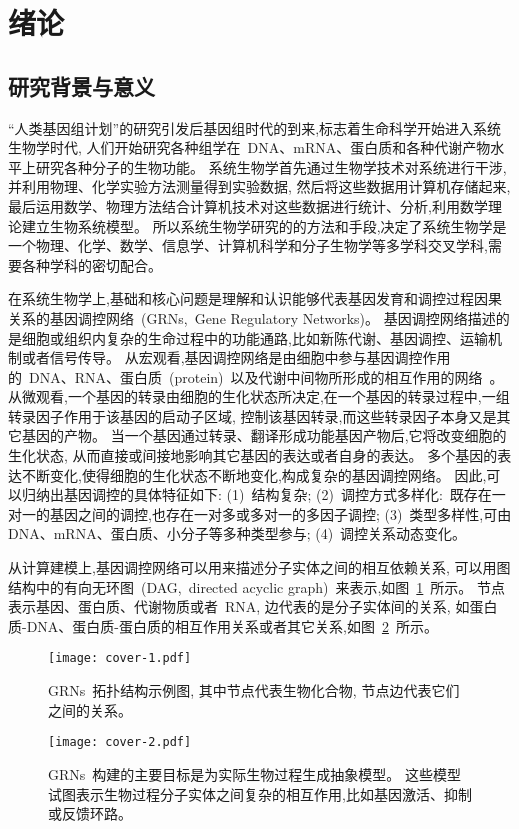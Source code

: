 \section{绪论}
\subsection{研究背景与意义}

``人类基因组计划”的研究引发后基因组时代的到来,标志着生命科学开始进入系统生物学时代,
人们开始研究各种组学在~DNA、mRNA、蛋白质和各种代谢产物水平上研究各种分子的生物功能。
系统生物学首先通过生物学技术对系统进行干涉,并利用物理、化学实验方法测量得到实验数据,
然后将这些数据用计算机存储起来,最后运用数学、物理方法结合计算机技术对这些数据进行统计、分析,利用数学理论建立生物系统模型。
所以系统生物学研究的的方法和手段,决定了系统生物学是一个物理、化学、数学、信息学、计算机科学和分子生物学等多学科交叉学科,需要各种学科的密切配合\cite{ideker2001new}。

在系统生物学上,基础和核心问题是理解和认识能够代表基因发育和调控过程因果关系的基因调控网络~(GRNs,~Gene Regulatory Networks)。
基因调控网络描述的是细胞或组织内复杂的生命过程中的功能通路,比如新陈代谢、基因调控、运输机制或者信号传导。
从宏观看,基因调控网络是由细胞中参与基因调控作用的~DNA、RNA、蛋白质~(protein)~以及代谢中间物所形成的相互作用的网络~\cite{de2002modeling}。
从微观看,一个基因的转录由细胞的生化状态所决定,在一个基因的转录过程中,一组转录因子作用于该基因的启动子区域,
控制该基因转录,而这些转录因子本身又是其它基因的产物。
当一个基因通过转录、翻译形成功能基因产物后,它将改变细胞的生化状态,
从而直接或间接地影响其它基因的表达或者自身的表达。
多个基因的表达不断变化,使得细胞的生化状态不断地变化,构成复杂的基因调控网络。
因此,可以归纳出基因调控的具体特征如下:
(1)~结构复杂;
(2)~调控方式多样化:~既存在一对一的基因之间的调控,也存在一对多或多对一的多因子调控;
(3)~类型多样性,可由DNA、mRNA、蛋白质、小分子等多种类型参与;
(4)~调控关系动态变化。


从计算建模上,基因调控网络可以用来描述分子实体之间的相互依赖关系,
可以用图结构中的有向无环图~(DAG,~directed acyclic graph)~来表示,如图~\ref{cover-1}~所示。
节点表示基因、蛋白质、代谢物质或者~RNA, 边代表的是分子实体间的关系,
如蛋白质-DNA、蛋白质-蛋白质的相互作用关系或者其它关系,如图~\ref{cover-2}~所示。
\begin{figure}[!htbp]
    \centering
    \texttt{[image: cover-1.pdf]}
    \caption{GRNs~拓扑结构示例图, 其中节点代表生物化合物, 节点边代表它们之间的关系。
    }
    \label{cover-1}
\end{figure}
\begin{figure}[!htbp]
    \centering
    \texttt{[image: cover-2.pdf]}
    \caption{GRNs~构建的主要目标是为实际生物过程生成抽象模型。
    这些模型试图表示生物过程分子实体之间复杂的相互作用,比如基因激活、抑制或反馈环路。
    }
    \label{cover-2}
\end{figure}

